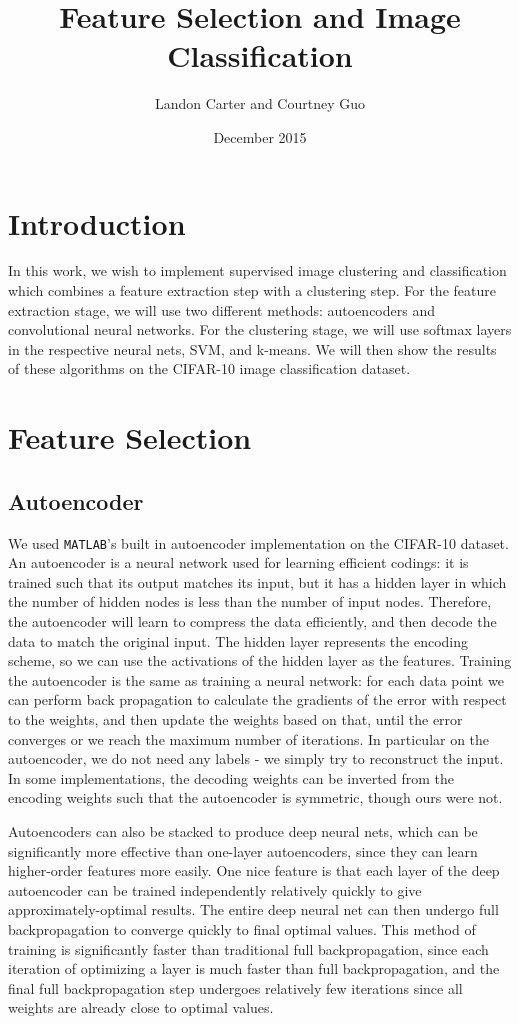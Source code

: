 \documentclass[11pt]{article}
\title{Feature Selection and Image Classification}
\author{Landon Carter and Courtney Guo}
\date{December 2015}
\begin{document}
\maketitle

\section{Introduction}
In this work, we wish to implement supervised image clustering and classification which combines a feature extraction step with a clustering step. For the feature extraction stage, we will use two different methods: autoencoders and convolutional neural networks. For the clustering stage, we will use softmax layers in the respective neural nets, SVM, and k-means. We will then show the results of these algorithms on the CIFAR-10 image classification dataset.

\section{Feature Selection}
\subsection{Autoencoder}
We used \texttt{MATLAB}'s built in autoencoder implementation on the CIFAR-10 dataset. An autoencoder is a neural network used for learning efficient codings: it is trained such that its output matches its input, but it has a hidden layer in which the number of hidden nodes is less than the number of input nodes. Therefore, the autoencoder will learn to compress the data efficiently, and then decode the data to match the original input. The hidden layer represents the encoding scheme, so we can use the activations of the hidden layer as the features. Training the autoencoder is the same as training a neural network: for each data point we can perform back propagation to calculate the gradients of the error with respect to the weights, and then update the weights based on that, until the error converges or we reach the maximum number of iterations. In particular on the autoencoder, we do not need any labels - we simply try to reconstruct the input. In some implementations, the decoding weights can be inverted from the encoding weights such that the autoencoder is symmetric, though ours were not.

Autoencoders can also be stacked to produce deep neural nets, which can be significantly more effective than one-layer autoencoders, since they can learn higher-order features more easily. One nice feature is that each layer of the deep autoencoder can be trained independently relatively quickly to give approximately-optimal results. The entire deep neural net can then undergo full backpropagation to converge quickly to final optimal values. This method of training is significantly faster than traditional full backpropagation, since each iteration of optimizing a layer is much faster than full backpropagation, and the final full backpropagation step undergoes relatively few iterations since all weights are already close to optimal values.
\end{document}
